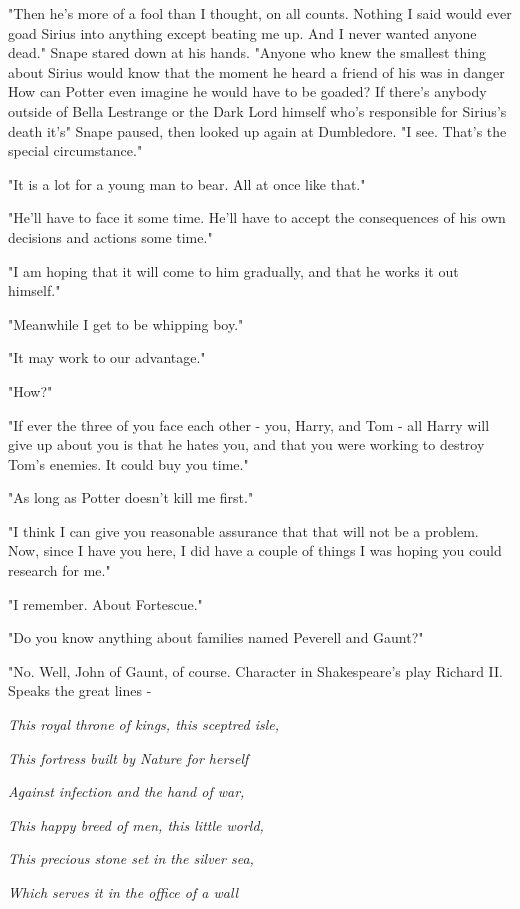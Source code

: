 "Then he's more of a fool than I thought, on all counts. Nothing I said would ever goad Sirius into anything except beating me up. And I never wanted anyone dead." Snape stared down at his hands. "Anyone who knew the smallest thing about Sirius would know that the moment he heard a friend of his was in danger{\el} How can Potter even imagine he would have to be goaded? If there's anybody outside of Bella Lestrange or the Dark Lord himself who's responsible for Sirius's death it's{\el}" Snape paused, then looked up again at Dumbledore. "I see. That's the special circumstance."

"It is a lot for a young man to bear. All at once like that."

"He'll have to face it some time. He'll have to accept the consequences of his own decisions and actions some time."

"I am hoping that it will come to him gradually, and that he works it out himself."

"Meanwhile I get to be whipping boy."

"It may work to our advantage."

"How?"

"If ever the three of you face each other - you, Harry, and Tom - all Harry will give up about you is that he hates you, and that you were working to destroy Tom's enemies. It could buy you time."

"As long as Potter doesn't kill me first."

"I think I can give you reasonable assurance that that will not be a problem. Now, since I have you here, I did have a couple of things I was hoping you could research for me."

"I remember. About Fortescue."

"Do you know anything about families named Peverell and Gaunt?"

"No. Well, John of Gaunt, of course. Character in Shakespeare's play Richard II. Speaks the great lines -

\emph{This royal throne of kings, this sceptred isle,}

\emph{{\el}This fortress built by Nature for herself}

\emph{Against infection and the hand of war,}

\emph{This happy breed of men, this little world,}

\emph{This precious stone set in the silver sea,}

\emph{Which serves it in the office of a wall}

